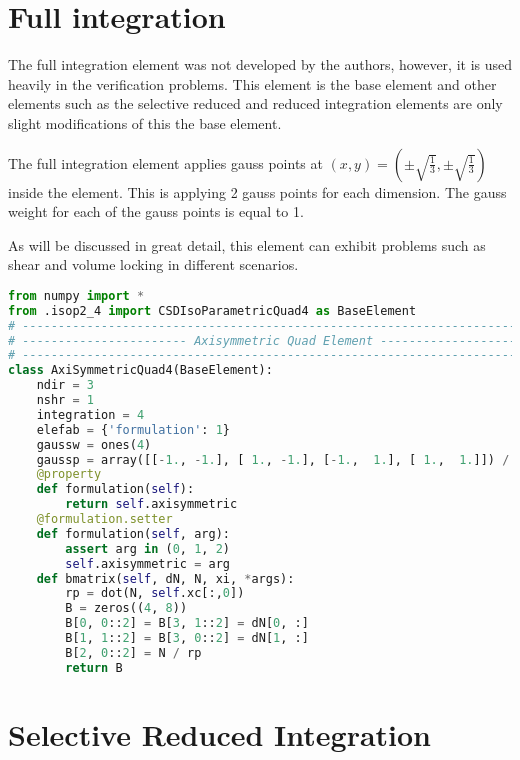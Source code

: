 \documentclass[10pt,letterpaper]{report}
\numberwithin{equation}{chapter}
\begin{document}
\section{Full integration}
The full integration element was not developed by the authors, however, it is used heavily in the verification problems. This element is the base element and other elements such as the selective reduced and reduced integration elements are only slight modifications of this the base element.

The full integration element applies gauss points at $(x,y)=(\pm\sqrt{\frac{1}{3}},\pm\sqrt{\frac{1}{3}})$ inside the element. This is applying 2 gauss points for each dimension. The gauss weight for each of the gauss points is equal to 1.

As will be discussed in great detail, this element can exhibit problems such as shear and volume locking in different scenarios.
\begin{lstlisting}[language=python]
from numpy import *
from .isop2_4 import CSDIsoParametricQuad4 as BaseElement
# --------------------------------------------------------------------------- #
# ----------------------- Axisymmetric Quad Element ------------------------- #
# --------------------------------------------------------------------------- #
class AxiSymmetricQuad4(BaseElement):
    ndir = 3
    nshr = 1
    integration = 4
    elefab = {'formulation': 1}
    gaussw = ones(4)
    gaussp = array([[-1., -1.], [ 1., -1.], [-1.,  1.], [ 1.,  1.]]) / sqrt(3.)
    @property
    def formulation(self):
        return self.axisymmetric
    @formulation.setter
    def formulation(self, arg):
        assert arg in (0, 1, 2)
        self.axisymmetric = arg
    def bmatrix(self, dN, N, xi, *args):
        rp = dot(N, self.xc[:,0])
        B = zeros((4, 8))
        B[0, 0::2] = B[3, 1::2] = dN[0, :]
        B[1, 1::2] = B[3, 0::2] = dN[1, :]
        B[2, 0::2] = N / rp
        return B

\end{lstlisting}


\section{Selective Reduced Integration}
\end{document}
